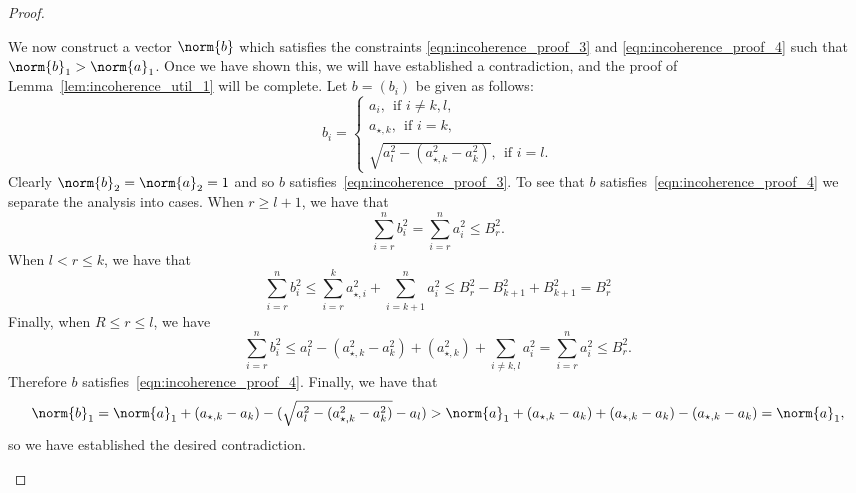 \documentclass{article}
\newcommand{\1}{\mathbf{1}}
\theoremstyle{alden}
\theoremstyle{aldenthm}
\theoremstyle{definition}
\theoremstyle{remark}
\begin{document}
\begin{proof}
\begin{itemize}
		We now construct a vector $\norm{b}$ which satisfies the constraints \eqref{eqn:incoherence_proof_3} and \eqref{eqn:incoherence_proof_4} such that $\norm{b}_1 > \norm{a}_1$. Once we have shown this, we will have established a contradiction, and the proof of Lemma~\ref{lem:incoherence_util_1} will be complete. Let $b = (b_i)$ be given as follows:
		\begin{equation*}
		b_i = 
		\begin{cases*}
		a_i, ~~\textrm{if $i \neq k,l$}, \\
		a_{\star,k}, ~~\textrm{if $i = k$}, \\
		\sqrt{a_l^2 - (a_{\star,k}^2 - a_k^2)}, ~~\textrm{if $i = l$.}
		\end{cases*}
		\end{equation*}
		Clearly $\norm{b}_2 = \norm{a}_2 = 1$ and so $b$ satisfies~\eqref{eqn:incoherence_proof_3}. To see that $b$ satisfies~\eqref{eqn:incoherence_proof_4} we separate the analysis into cases. When $r \geq l + 1$, we have that
		\begin{equation*}
		\sum_{i = r}^{n} b_i^2 = \sum_{i = r}^{n} a_i^2 \leq B_r^2.
		\end{equation*}
		When $l < r \leq k$, we have that
		\begin{equation*}
		\sum_{i = r}^{n} b_i^2 \leq \sum_{i = r}^{k} a_{\star,i}^2 + \sum_{i = k +1}^{n} a_{i}^2 \leq B_r^2 - B_{k + 1}^2 + B_{k + 1}^2 = B_r^2
		\end{equation*}
		Finally, when $R \leq r \leq l$, we have
		\begin{equation*}
		\sum_{i = r}^{n} b_i^2 \leq a_l^2 - (a_{\star,k}^2 - a_k^2) + (a_{\star,k}^2) + \sum_{i \neq k,l} a_i^2 = \sum_{i = r}^{n} a_i^2 \leq B_r^2.
		\end{equation*}
		Therefore $b$ satisfies~\eqref{eqn:incoherence_proof_4}. Finally, we have that
		\begin{equation*}
		\norm{b}_1 = \norm{a}_1 + (a_{\star,k}  - a_k) - (\sqrt{a_l^2 - (a_{\star,k}^2 - a_k^2)} - a_l) > \norm{a}_1 + (a_{\star,k}  - a_k) + (a_{\star,k}  - a_k) - (a_{\star,k}  - a_k) = \norm{a}_1,
		\end{equation*}
		so we have established the desired contradiction.
	\end{itemize}
\end{proof}
\end{document}
